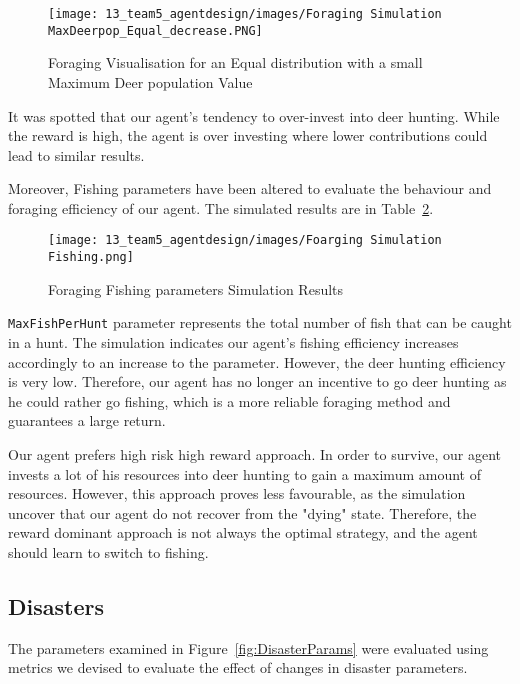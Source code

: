 \begin{figure}[!htb]
    \centering
    \texttt{[image: 13\_team5\_agentdesign/images/Foraging Simulation MaxDeerpop\_Equal\_decrease.PNG]}
    \caption{Foraging Visualisation for an Equal distribution with a small Maximum Deer population Value}
    \label{fig:Foraging Simulation MaxDeerpop_Equal_decrease}
\end{figure}

It was spotted that our agent's tendency to over-invest into deer hunting. While the reward is high, the agent is over investing where lower contributions could lead to similar results.

Moreover, Fishing parameters have been altered to evaluate the behaviour and foraging efficiency of our agent. The simulated results are in Table~\ref{fig:Foraging Fishing parameters Simulation Results}.

\begin{figure}[!htb]
    \centering
    \texttt{[image: 13\_team5\_agentdesign/images/Foarging Simulation Fishing.png]}
    \caption{Foraging Fishing parameters Simulation Results}
    \label{fig:Foraging Fishing parameters Simulation Results}
\end{figure}

\texttt{MaxFishPerHunt} parameter represents the total number of fish that can be caught in a hunt. The simulation indicates our agent's fishing efficiency increases accordingly to an increase to the parameter. However, the deer hunting efficiency is very low. Therefore, our agent has no longer an incentive to go deer hunting as he could rather go fishing, which is a more reliable foraging method and guarantees a large return.

Our agent prefers high risk high reward approach. In order to survive, our agent invests a lot of his resources into deer hunting to gain a maximum amount of resources. However, this approach proves less favourable, as the simulation uncover that our agent do not recover from the "dying" state. Therefore, the reward dominant approach is not always the optimal strategy, and the agent should learn to switch to fishing.


\subsection{Disasters}
The parameters examined in Figure~\ref{fig:DisasterParams} were evaluated using metrics we devised to evaluate the effect of changes in disaster parameters. 

